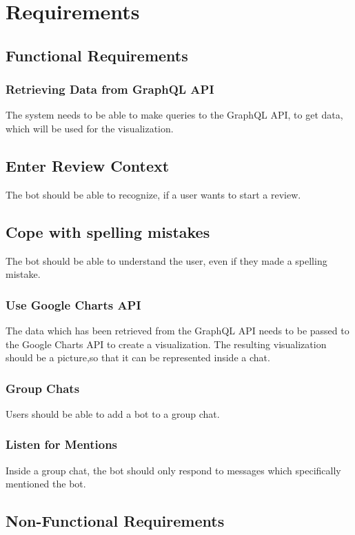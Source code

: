 \section{Requirements}

\subsection{Functional Requirements}

\subsubsection{Retrieving Data from GraphQL API}
The system needs to be able to make queries to the GraphQL API, to get data, which will be used for the visualization.

\subsection{Enter Review Context} The bot should be able to recognize, if a user wants to start a review.

\subsection{Cope with spelling mistakes} The bot should be able to understand the user, even if they made a spelling mistake.

\subsubsection{Use Google Charts API} The data which has been retrieved from the GraphQL API needs to be passed to the Google Charts API to create a visualization. The resulting visualization should be a picture,so that it can be represented inside a chat.

\subsubsection{Group Chats} Users should be able to add a bot to a group chat.

\subsubsection{Listen for Mentions} Inside a group chat, the bot should only respond to messages which specifically mentioned the bot.

\subsection{Non-Functional Requirements}

